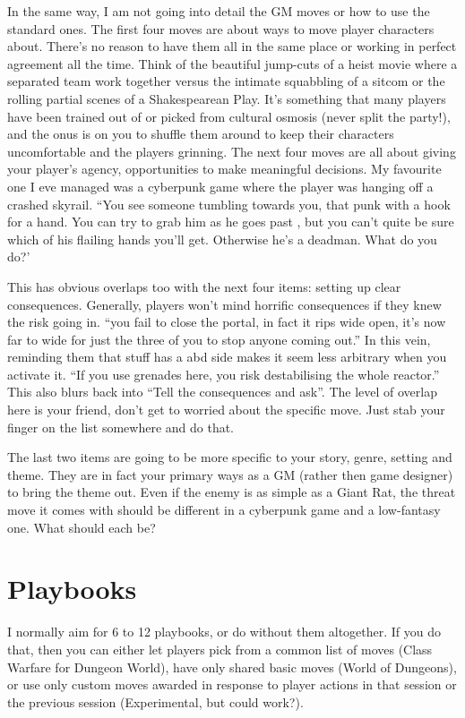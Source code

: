 \documentclass{tufte-handout}
\begin{document}
In the same way, I am not going into detail the GM moves or how to use the standard ones. The first four moves are about ways to move player characters about. There's no reason to have them all in the same place or working in perfect agreement all the time. Think of the beautiful jump-cuts of a heist movie where a separated team work together versus the intimate squabbling of a sitcom or the rolling partial scenes of a Shakespearean Play. It's something that many players have been trained out of or picked from cultural osmosis (never split the party!), and the onus is on you to shuffle them around to keep their characters uncomfortable and the players grinning.
The next four moves are all about giving your player's agency, opportunities to make meaningful decisions. My favourite one I eve managed was a cyberpunk game where the player was hanging off a crashed skyrail. ``You see someone tumbling towards you, that punk with a hook for a hand. You can try to grab him as he goes past , but you can't quite be sure which of his flailing hands you'll get. Otherwise he's a deadman. What do you do?'

This has obvious overlaps too with the next four items: setting up clear consequences. Generally, players won't mind horrific consequences if they knew the risk going in. ``you fail to close the portal, in fact it rips wide open, it's now far to wide for just the three of you to stop anyone coming out.'' In this vein, reminding them that stuff has a abd side makes it seem less arbitrary when you activate it. ``If you use grenades here, you risk destabilising the whole reactor.'' This also blurs back into ``Tell the consequences and ask''.  The level of overlap here is your friend, don't get to worried about the specific move. Just stab your finger on the list somewhere and do that.

The last two items are going to be more specific to your story, genre, setting and theme. They are in fact your primary ways as a GM (rather then game designer) to bring the theme out.  Even if the enemy is as simple as a Giant Rat, the threat move it comes with should be different in a cyberpunk game and a low-fantasy one. What should each be?

\section{Playbooks}
I normally aim for 6 to 12 playbooks, or do without them altogether. If you do that, then you can either let  players pick from a common list of moves (Class Warfare for Dungeon World), have only shared basic moves (World of Dungeons), or use only custom moves awarded in response to player actions in that session or the previous session (Experimental, but could work?).
\end{document}

